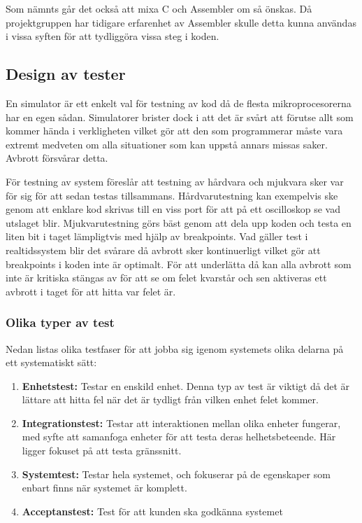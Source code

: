 \documentclass[11pt]{article}
\begin{document}
\begin{flushleft}
Som nämnts går det också att mixa C och Assembler om så önskas. Då projektgruppen har tidigare erfarenhet av Assembler skulle detta kunna användas i vissa syften för att tydliggöra vissa steg i koden. 

\subsection{Design av tester}
En simulator är ett enkelt val för testning av kod då de flesta mikroprocesorerna har en egen sådan. Simulatorer brister dock i att det är svårt att förutse allt som kommer hända i verkligheten vilket gör att den som programmerar måste vara extremt medveten om alla situationer som kan uppstå annars missas saker. Avbrott försvårar detta.\cite{RWD}

För testning av system föreslår \cite{RWD} att testning av hårdvara och mjukvara sker var för sig för att sedan testas tillsammans. Hårdvarutestning kan exempelvis ske genom att enklare kod skrivas till en viss port för att på ett oscilloskop se vad utslaget blir. Mjukvarutestning görs bäst genom att dela upp koden och testa en liten bit i taget lämpligtvis med hjälp av breakpoints. Vad gäller test i realtidssystem blir det svårare då avbrott sker kontinuerligt vilket gör att breakpoints i koden inte är optimalt. För att underlätta då kan alla avbrott som inte är kritiska stängas av för att se om felet kvarstår och sen aktiveras ett avbrott i taget för att hitta var felet är.

\subsubsection{Olika typer av test}
Nedan listas olika testfaser för att jobba sig igenom systemets olika delarna på ett systematiskt sätt:
\begin{enumerate}
	\item \textbf{Enhetstest:} Testar en enskild enhet. Denna typ av test är viktigt då det är lättare att hitta fel när det är tydligt från vilken enhet felet kommer.
	\item \textbf{Integrationstest:} Testar att interaktionen mellan olika enheter fungerar, med syfte att samanfoga enheter för att testa deras helhetsbeteende. Här ligger fokuset på att testa gränssnitt.
	\item \textbf{Systemtest:} Testar hela systemet, och fokuserar på de egenskaper som enbart finns när systemet är komplett.
	\item \textbf{Acceptanstest:} Test för att kunden ska godkänna systemet  
\end{enumerate}


\end{flushleft}
\end{document}
